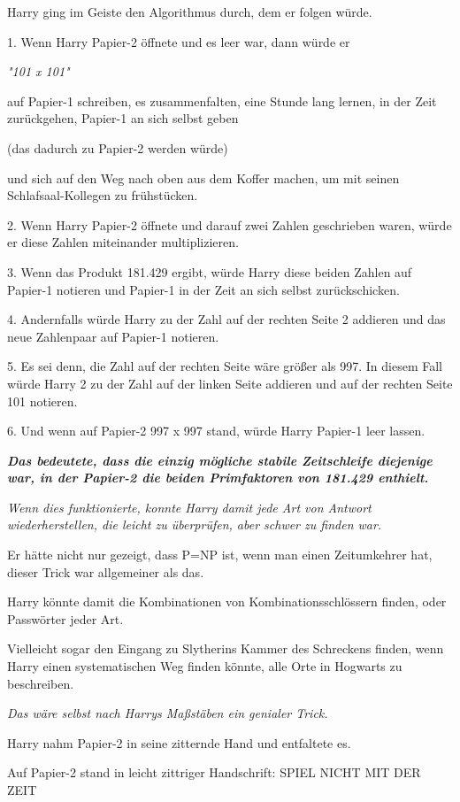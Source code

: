 {Harry ging im Geiste den Algorithmus durch, dem er folgen würde.

1. Wenn Harry Papier-2 öffnete und es leer war, dann würde er

\emph{"101 x 101"}

auf Papier-1 schreiben, es zusammenfalten, eine Stunde lang lernen, in der Zeit zurückgehen, Papier-1 an sich selbst geben

(das dadurch zu Papier-2 werden würde)

und sich auf den Weg nach oben aus dem Koffer machen, um mit seinen Schlafsaal-Kollegen zu frühstücken.

2. Wenn Harry Papier-2 öffnete und darauf zwei Zahlen geschrieben waren, würde er diese Zahlen miteinander multiplizieren.

3. Wenn das Produkt 181.429 ergibt, würde Harry diese beiden Zahlen auf Papier-1 notieren und Papier-1 in der Zeit an sich selbst zurückschicken.

4. Andernfalls würde Harry zu der Zahl auf der rechten Seite 2 addieren und das neue Zahlenpaar auf Papier-1 notieren.

5. Es sei denn, die Zahl auf der rechten Seite wäre größer als 997. In diesem Fall würde Harry 2 zu der Zahl auf der linken Seite addieren und auf der rechten Seite 101 notieren.

6. Und wenn auf Papier-2 997 x 997 stand, würde Harry Papier-1 leer lassen.

\textbf{\emph{Das bedeutete, dass die einzig mögliche stabile Zeitschleife diejenige war, in der Papier-2 die beiden Primfaktoren von 181.429 enthielt.}}

\emph{Wenn dies funktionierte, konnte Harry damit jede Art von Antwort wiederherstellen, die leicht zu überprüfen, aber schwer zu finden war.}

Er hätte nicht nur gezeigt, dass P=NP ist, wenn man einen Zeitumkehrer hat, dieser Trick war allgemeiner als das.

Harry könnte damit die Kombinationen von Kombinationsschlössern finden, oder Passwörter jeder Art.

Vielleicht sogar den Eingang zu Slytherins Kammer des Schreckens finden, wenn Harry einen systematischen Weg finden könnte, alle Orte in Hogwarts zu beschreiben.

\emph{Das wäre selbst nach Harrys Maßstäben ein genialer Trick.}

Harry nahm Papier-2 in seine zitternde Hand und entfaltete es.

Auf Papier-2 stand in leicht zittriger Handschrift: SPIEL NICHT MIT DER ZEIT

}
